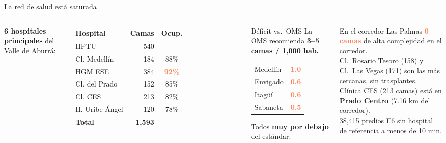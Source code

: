 \documentclass[aspectratio=169, 11pt]{beamer}
\newcommand{\danger}[1]{\textcolor{coral}{\textbf{#1}}}
\newcommand{\src}[1]{\par\vspace{2pt}{\tiny\textcolor{slate}{Fuente: #1}}}
\begin{document}
\begin{frame}{La red de salud está saturada}

\begin{columns}[T]
\textbf{6 hospitales principales} del Valle de Aburrá:

\vspace{6pt}
{\small
\begin{tabular}{@{}lrc@{}}
\toprule
\textbf{Hospital} & \textbf{Camas} & \textbf{Ocup.} \\
\midrule
\rowcolor{coral!8}
HPTU & 540 & \\
Cl. Medellín & 184 & 88\% \\
\rowcolor{coral!5}
HGM ESE & 384 & \danger{92\%} \\
Cl. del Prado & 152 & 85\% \\
Cl. CES & 213 & 82\% \\
H. Uribe Ángel & 120 & 78\% \\
\midrule
\textbf{Total} & \textbf{1,593} & \\
\bottomrule
\end{tabular}
}
\src{REPS (b4dp-ximh), Capacidad Instalada (s2ru-bqt6)}

\begin{alertblock}{\small Déficit vs.\ OMS}
\small La OMS recomienda \textbf{3--5 camas / 1,000 hab.}

\vspace{6pt}
\begin{tabular}{@{}lc@{}}
Medellín & \danger{1.0} \\
Envigado & \danger{0.6} \\
Itagüí & \danger{0.6} \\
Sabaneta & \danger{0.5} \\
\end{tabular}

\vspace{6pt}
Todos \textbf{muy por debajo} del estándar.
\end{alertblock}

\vspace{6pt}
\begin{block}{\small En el corredor Las Palmas}
\small \danger{0 camas} de alta complejidad en el corredor.\\
Cl.\ Rosario Tesoro (158) y Cl.\ Las Vegas (171) son las más cercanas, sin trasplantes.\\[4pt]
Clínica CES (213 camas) está en \textbf{Prado Centro} (7.16 km del corredor).\\[4pt]
38,415 predios E6 sin hospital de referencia a menos de 10 min.
\end{block}
\end{columns}
\end{frame}
\end{document}
